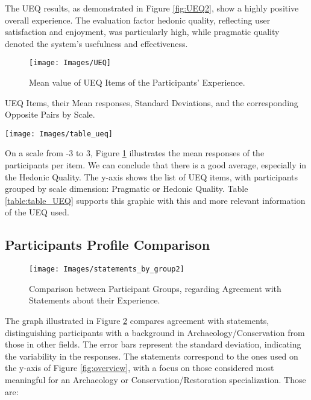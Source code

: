 The \gls{UEQ} results, as demonstrated in Figure \ref{fig:UEQ2}, show a highly positive overall experience. 
The evaluation factor hedonic quality, reflecting user satisfaction and enjoyment, was particularly high, while pragmatic quality denoted the system’s usefulness and effectiveness.
\begin{figure}[h!]
    \centering
    \texttt{[image: Images/UEQ]}
    \caption{Mean value of \gls{UEQ} Items of the Participants' Experience.} 
    \label{fig:UEQ1}
\end{figure}
\begin{table}[h!]
    \caption{\gls{UEQ} Items, their Mean responses, Standard Deviations, and the corresponding Opposite Pairs by Scale.}
    \centering
    \texttt{[image: Images/table\_ueq]}
    \label{table:table_UEQ}
\end{table}


On a scale from -3 to 3, Figure \ref{fig:UEQ1} illustrates the mean responses of the participants per item.  
We can conclude that there is a good average, especially in the Hedonic Quality.  
The y-axis shows the list of \gls{UEQ} items, with participants grouped by scale dimension: Pragmatic or Hedonic Quality.  
Table \ref{table:table_UEQ} supports this graphic with this and more relevant information of the \gls{UEQ} used.

\subsection{Participants Profile Comparison}
\label{sec:comparison}

\begin{figure}[h!]
    \centering
    \texttt{[image: Images/statements\_by\_group2]}
    \caption{Comparison between Participant Groups, regarding Agreement with Statements about their Experience.} 
    \label{fig:statements_background}
\end{figure}

The graph illustrated in Figure \ref{fig:statements_background} compares agreement with statements, distinguishing participants with a background in Archaeology/Conservation from those in other fields. The error bars represent the standard deviation, indicating the variability in the responses.
The statements correspond to the ones used on the y-axis of Figure \ref{fig:overview}, with a focus on those considered most meaningful for an Archaeology or Conservation/Restoration specialization.
Those are: 

